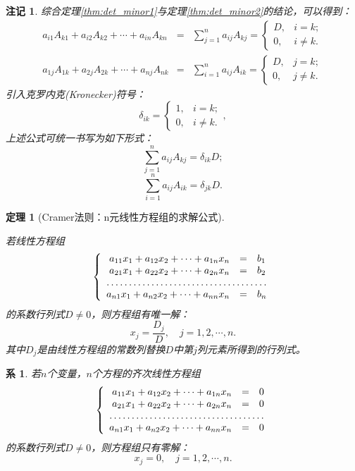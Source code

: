 \documentclass[a4paper]{book}
\newtheorem{cor}{系}[chapter]
\newtheorem{thm}{定理}[chapter]
\newtheorem{rmk}{注记}[chapter]
\begin{document}
\begin{rmk}
综合定理\ref{thm:det_minor1}与定理\ref{thm:det_minor2}的结论，可以得到：
\begin{eqnarray*}
a_{i1}A_{k1} + a_{i2}A_{k2} + \cdots + a_{in}A_{kn} & = & \sum\limits_{j=1}^n a_{ij}A_{kj} = \begin{cases}
D, & i = k; \\ 0, & i \neq k.
\end{cases} \\
a_{1j}A_{1k} + a_{2j}A_{2k} + \cdots + a_{nj}A_{nk} & = & \sum\limits_{i=1}^n a_{ij}A_{ik} = \begin{cases}
D, & j = k; \\ 0, & j \neq k.
\end{cases}
\end{eqnarray*}
引入克罗内克(Kronecker)符号：
$$\delta_{ik} =
\begin{cases}
1, & i = k; \\ 0, & i \neq k.
\end{cases},$$
上述公式可统一书写为如下形式：
$$\sum\limits_{j=1}^n a_{ij}A_{kj} = \delta_{ik}D;$$ $$\sum\limits_{i=1}^n a_{ij}A_{ik} = \delta_{jk}D.$$
\end{rmk}

\begin{thm}[Cramer法则：n元线性方程组的求解公式]\

若线性方程组
$$\left\{ \begin{array}{rcl} a_{11}x_1 + a_{12}x_2 + \cdots + a_{1n}x_n & = & b_1 \\ a_{21}x_1 + a_{22}x_2 + \cdots + a_{2n}x_n & = & b_2 \\ \hdotsfor{3} \\ a_{n1}x_1 + a_{n2}x_2 + \cdots + a_{nn}x_n & = & b_n \end{array}\right.$$
的系数行列式$D\neq 0$，则方程组有唯一解：
$$x_j = \frac{D_j}{D}, \quad j = 1,2,\cdots,n.$$
其中$D_j$是由线性方程组的常数列替换$D$中第$j$列元素所得到的行列式。
\end{thm}

\begin{cor}
若$n$个变量，$n$个方程的齐次线性方程组
$$\left\{ \begin{array}{rcl} a_{11}x_1 + a_{12}x_2 + \cdots + a_{1n}x_n & = & 0 \\ a_{21}x_1 + a_{22}x_2 + \cdots + a_{2n}x_n & = & 0 \\ \hdotsfor{3} \\ a_{n1}x_1 + a_{n2}x_2 + \cdots + a_{nn}x_n & = & 0 \end{array}\right.$$
的系数行列式$D\neq 0$，则方程组只有零解：
$$x_j = 0, \quad j = 1,2,\cdots,n.$$
\end{cor}
\end{document}
